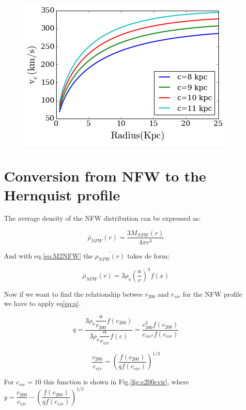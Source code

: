 \documentclass[a4paper, 12pt]{article} %
\begin{document}
\begin{figure}[H]
\centering
\includegraphics[scale=0.7]{NFW_vc.png}
\end{figure}



\section{Conversion from NFW to the Hernquist profile}

The average density of the NFW distribution can be expressed as:

\begin{equation}
\bar \rho_{NFW}(r) = \dfrac{3M_{NFW}(r)}{4 \pi r^3} 
\end{equation}

And with eq.\ref{eq:M2NFW} the $\bar{\rho_{NFW}(r)}$ takes de form:

\begin{equation}
\bar \rho_{NFW}(r) = 3 \rho_a \left( \dfrac{a}{r} \right)^{3}  f(x)
\end{equation}

Now if we want to find the relationship betwee $r_{200}$ and $r_{vir}$ 
for the NFW profile we have to apply eq\ref{eq:q}. 

\begin{equation}
q = \dfrac{3 \rho_a \dfrac{a}{r_{200}} f(c_{200})}{3 \rho_a \dfrac{a}{r_{vir}}f(c)} = \dfrac{c_{200}^{3}f(c_{200})}{c_{vir^3}f(c_{vir})}
\end{equation}


\begin{equation}\label{eq:c200cvir}
\dfrac{c_{200}}{c_{vir}} = \left( \dfrac{f(c_{200})}{qf(c_{vir})} \right)^{1/3}
\end{equation}

For $c_{vir} = 10$ this function is shown in Fig.\ref{fig:c200cvir}, where 
$y = \dfrac{c_{200}}{c_{vir}} - \left( \dfrac{f(c_{200})}{qf(c_{vir})} \right)^{1/3}$
\end{document}
